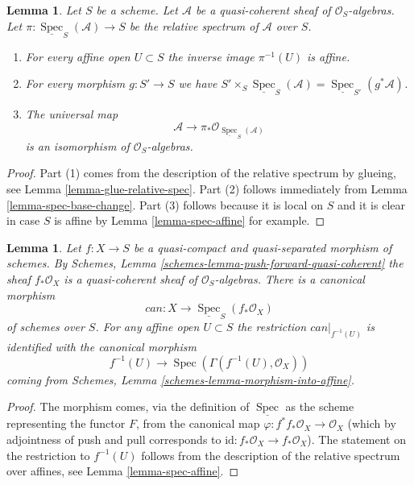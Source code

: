\documentclass{stacks-project}
\theoremstyle{plain}
\newtheorem{lemma}[subsection]{Lemma}
\theoremstyle{definition}
\theoremstyle{remark}
\numberwithin{equation}{subsection}
\def\Spec{\mathop{\mathrm{Spec}}}
\begin{document}
\begin{lemma}
\label{lemma-spec-properties}
Let $S$ be a scheme. Let $\mathcal{A}$ be a quasi-coherent
sheaf of $\mathcal{O}_S$-algebras. Let
$\pi : \underline{\Spec}_S(\mathcal{A}) \to S$
be the relative spectrum of $\mathcal{A}$ over $S$.
\begin{enumerate}
\item For every affine open $U \subset S$ the inverse image
$\pi^{-1}(U)$ is affine.
\item For every morphism $g : S' \to S$ we have
$S' \times_S \underline{\Spec}_S(\mathcal{A}) =
\underline{\Spec}_{S'}(g^*\mathcal{A})$.
\item
The universal map
$$
\mathcal{A}
\longrightarrow
\pi_*\mathcal{O}_{\underline{\Spec}_S(\mathcal{A})}
$$
is an isomorphism of $\mathcal{O}_S$-algebras.
\end{enumerate}
\end{lemma}

\begin{proof}
Part (1) comes from the description of the relative spectrum
by glueing, see Lemma \ref{lemma-glue-relative-spec}.
Part (2) follows immediately from Lemma \ref{lemma-spec-base-change}.
Part (3) follows because it is local on $S$ and it is clear in case $S$
is affine by Lemma \ref{lemma-spec-affine} for example.
\end{proof}

\begin{lemma}
\label{lemma-canonical-morphism}
Let $f : X \to S$ be a quasi-compact and quasi-separated morphism
of schemes. By Schemes, Lemma \ref{schemes-lemma-push-forward-quasi-coherent}
the sheaf $f_*\mathcal{O}_X$ is a quasi-coherent sheaf of
$\mathcal{O}_S$-algebras. There is a canonical morphism
$$
can : X \longrightarrow \underline{\Spec}_S(f_*\mathcal{O}_X)
$$
of schemes over $S$.
For any affine open $U \subset S$ the restriction $can|_{f^{-1}(U)}$
is identified with the canonical morphism
$$
f^{-1}(U) \longrightarrow \Spec(\Gamma(f^{-1}(U), \mathcal{O}_X))
$$
coming from Schemes, Lemma \ref{schemes-lemma-morphism-into-affine}.
\end{lemma}

\begin{proof}
The morphism comes, via the definition of $\underline{\Spec}$
as the scheme representing the functor $F$, from the canonical map
$\varphi : f^*f_*\mathcal{O}_X \to \mathcal{O}_X$ (which by adjointness of
push and pull corresponds to
$\text{id} : f_*\mathcal{O}_X \to f_*\mathcal{O}_X$).
The statement on the restriction to $f^{-1}(U)$
follows from the description of the relative spectrum over
affines, see Lemma \ref{lemma-spec-affine}.
\end{proof}
\end{document}
